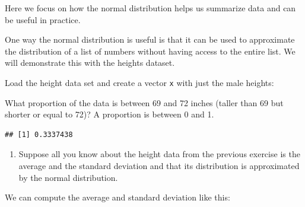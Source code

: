 \documentclass[
]{article}
\newenvironment{Shaded}{\begin{snugshade}}{\end{snugshade}}
\newcommand{\DecValTok}[1]{\textcolor[rgb]{0.00,0.00,0.81}{#1}}
\newcommand{\KeywordTok}[1]{\textcolor[rgb]{0.13,0.29,0.53}{\textbf{#1}}}
\newcommand{\NormalTok}[1]{#1}
\newcommand{\OperatorTok}[1]{\textcolor[rgb]{0.81,0.36,0.00}{\textbf{#1}}}
\newcommand{\StringTok}[1]{\textcolor[rgb]{0.31,0.60,0.02}{#1}}
\providecommand{\tightlist}{%
  \setlength{\itemsep}{0pt}\setlength{\parskip}{0pt}}
\begin{document}
Here we focus on how the normal distribution helps us summarize data and
can be useful in practice.

One way the normal distribution is useful is that it can be used to
approximate the distribution of a list of numbers without having access
to the entire list. We will demonstrate this with the heights dataset.

Load the height data set and create a vector \texttt{x} with just the
male heights:

\begin{Shaded}
\end{Shaded}

What proportion of the data is between 69 and 72 inches (taller than 69
but shorter or equal to 72)? A proportion is between 0 and 1.

\begin{Shaded}
\end{Shaded}

\begin{verbatim}
## [1] 0.3337438
\end{verbatim}

\begin{enumerate}
\def\labelenumi{\arabic{enumi}.}
\setcounter{enumi}{1}
\tightlist
\item
  Suppose all you know about the height data from the previous exercise
  is the average and the standard deviation and that its distribution is
  approximated by the normal distribution.
\end{enumerate}

We can compute the average and standard deviation like this:

\begin{Shaded}
\end{Shaded}
\end{document}
